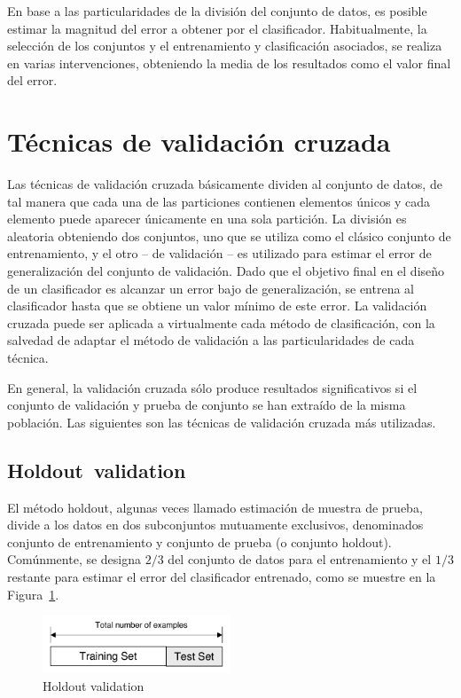 \documentclass{article}
\begin{document}
En base a las particularidades de la división del conjunto de datos, es posible estimar la magnitud del error a obtener por el clasificador.
Habitualmente, la selección de los conjuntos y el entrenamiento y clasificación asociados, se realiza en varias intervenciones, obteniendo la media de los resultados como el valor final del error.


\section{Técnicas de validación cruzada}
Las técnicas de validación cruzada básicamente dividen al conjunto de datos, de tal manera que cada una de las particiones contienen elementos únicos y cada elemento puede aparecer únicamente en una sola partición.
La división es aleatoria obteniendo dos conjuntos, uno que se utiliza como el clásico conjunto de entrenamiento, y el otro -- de validación -- es utilizado para estimar el error de generalización del conjunto de validación.
Dado que el objetivo final en el diseño de un clasificador es alcanzar un error bajo de generalización, se entrena al clasificador hasta que se obtiene un valor mínimo de este error.
La validación cruzada puede ser aplicada a virtualmente cada método de clasificación, con la salvedad de adaptar el método de validación a las particularidades de cada técnica.


En general, la validación cruzada sólo produce resultados significativos si el conjunto de validación y prueba de conjunto se han extraído de la misma población.
Las siguientes son las técnicas de validación cruzada más utilizadas.


\subsection{Holdout validation}
El método holdout, algunas veces llamado estimación de muestra de prueba, divide a los datos en dos subconjuntos mutuamente exclusivos, denominados conjunto de entrenamiento y conjunto de prueba (o conjunto holdout).
Comúnmente, se designa $2/3$ del conjunto de datos para el entrenamiento y el $1/3$ restante para estimar el error del clasificador entrenado, como se muestre en la Figura~\ref{fig:holdout-validation}.
\begin{figure}
	\centering
	\includegraphics[width=0.5\textwidth]{resources/images/holdout}
	\caption{Holdout validation}
	\label{fig:holdout-validation}
\end{figure}
\end{document}
